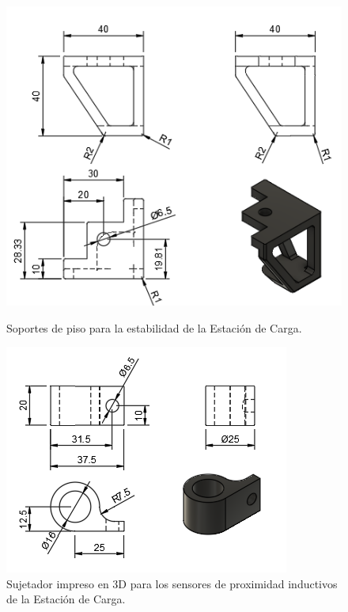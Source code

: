 \begin{figure}[h]
    \centering
    \begin{minipage}{0.45\textwidth}
        \centering
        \includegraphics[width=\textwidth]{PLANOS/PLANO_PATAS_ESTABILIDAD_CAJON.png}
        \caption{Soportes de piso para la estabilidad de la Estación de Carga.}
        \label{fig:imagen1}
    \end{minipage}%
    \hfill
    \begin{minipage}{0.45\textwidth}
        \centering
        \includegraphics[width=\textwidth]{PLANOS/PLANO_SENSOR.png}
        \caption{Sujetador impreso en 3D para los sensores de proximidad inductivos de la Estación de Carga.}
        \label{fig:imagen2}
    \end{minipage}%
    \hfill
\end{figure}

